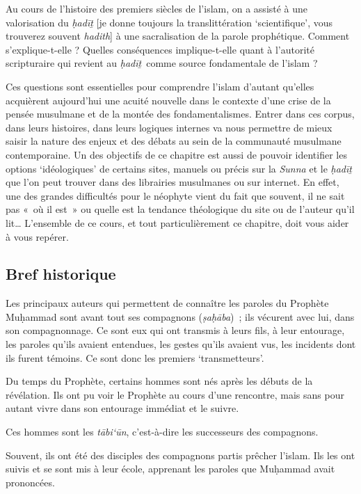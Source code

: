 Au cours de l'histoire des premiers siècles de l'islam, on a assisté à
une valorisation du \emph{ḥadīṯ} {[}je donne toujours la
translittération `scientifique', vous trouverez souvent \emph{hadith}{]}
à une sacralisation de la parole prophétique. Comment s'explique-t-elle
? Quelles conséquences implique-t-elle quant à l'autorité scripturaire
qui revient au \emph{ḥadīṯ}~comme source fondamentale de l'islam ?

Ces questions sont essentielles pour comprendre l'islam d'autant
qu'elles acquièrent aujourd'hui une acuité nouvelle dans le contexte
d'une crise de la pensée musulmane et de la montée des fondamentalismes.
Entrer dans ces corpus, dans leurs histoires, dans leurs logiques
internes va nous permettre de mieux saisir la nature des enjeux et des
débats au sein de la communauté musulmane contemporaine. Un des
objectifs de ce chapitre est aussi de pouvoir identifier les options
`idéologiques' de certains sites, manuels ou précis sur la \emph{Sunna}
et le \emph{ḥadīṯ} que l'on peut trouver dans des librairies musulmanes
ou sur internet. En effet, une des grandes difficultés pour le néophyte
vient du fait que souvent, il ne sait pas «~où il est~» ou quelle est la
tendance théologique du site ou de l'auteur qu'il lit\ldots{} L'ensemble
de ce cours, et tout particulièrement ce chapitre, doit vous aider à
vous repérer.



\subsection{Bref historique
}\label{bref-historique}

\begin{Def}[ṣaḥāba]
Les principaux auteurs qui permettent de connaître les paroles du
Prophète Muḥammad sont avant tout ses compagnons (\emph{ṣaḥāba})~; ils
vécurent avec lui, dans son compagnonnage. Ce sont eux qui ont transmis
à leurs fils, à leur entourage, les paroles qu'ils avaient entendues,
les gestes qu'ils avaient vus, les incidents dont ils furent témoins. Ce
sont donc les premiers `transmetteurs'.
\end{Def}


Du temps du Prophète, certains hommes sont nés après les débuts de la
révélation. Ils ont pu voir le Prophète au cours d'une rencontre, mais
sans pour autant vivre dans son entourage immédiat et le suivre. 
\begin{Def}[tābi`ūn]
Ces
hommes sont les \emph{tābi`ūn}, c'est-à-dire les successeurs des
compagnons.
\end{Def}
 Souvent, ils ont été des disciples des compagnons partis
prêcher l'islam. Ils les ont suivis et se sont mis à leur école,
apprenant les paroles que Muḥammad avait prononcées.

